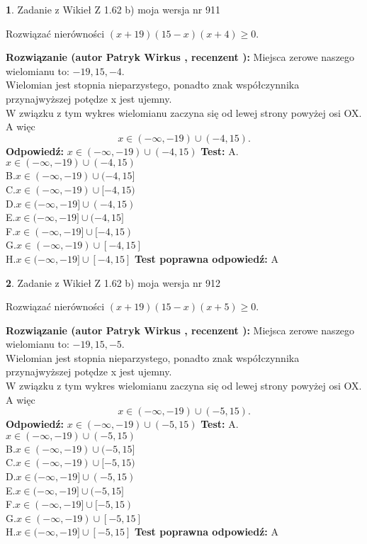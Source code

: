 \documentclass[12pt, a4paper]{article}
\theoremstyle{definition} %
\newtheorem{zad}{}
\newcommand{\zadStart}[1]{\begin{zad}#1\newline}
\newcommand{\zadStop}{\end{zad}}
\newcommand{\rozwStart}[2]{\noindent \textbf{Rozwiązanie (autor #1 , recenzent #2): }\newline}
\newcommand{\rozwStop}{\newline}
\newcommand{\odpStart}{\noindent \textbf{Odpowiedź:}\newline}
\newcommand{\odpStop}{\newline}
\newcommand{\testStart}{\noindent \textbf{Test:}\newline}
\newcommand{\testStop}{\newline}
\newcommand{\kluczStart}{\noindent \textbf{Test poprawna odpowiedź:}\newline}
\newcommand{\kluczStop}{\newline}
\begin{document}
\zadStart{Zadanie z Wikieł Z 1.62 b) moja wersja nr 911}

Rozwiązać nierówności $(x+19)(15-x)(x+4)\ge0$.
\zadStop
\rozwStart{Patryk Wirkus}{}
Miejsca zerowe naszego wielomianu to: $-19, 15, -4$.\\
Wielomian jest stopnia nieparzystego, ponadto znak współczynnika przy\linebreak najwyższej potędze x jest ujemny.\\ W związku z tym wykres wielomianu zaczyna się od lewej strony powyżej osi OX. A więc $$x \in (-\infty,-19) \cup (-4,15).$$
\rozwStop
\odpStart
$x \in (-\infty,-19) \cup (-4,15)$
\odpStop
\testStart
A.$x \in (-\infty,-19) \cup (-4,15)$\\
B.$x \in (-\infty,-19) \cup (-4,15]$\\
C.$x \in (-\infty,-19) \cup [-4,15)$\\
D.$x \in (-\infty,-19] \cup (-4,15)$\\
E.$x \in (-\infty,-19] \cup (-4,15]$\\
F.$x \in (-\infty,-19] \cup [-4,15)$\\
G.$x \in (-\infty,-19) \cup [-4,15]$\\
H.$x \in (-\infty,-19] \cup [-4,15]$
\testStop
\kluczStart
A
\kluczStop



\zadStart{Zadanie z Wikieł Z 1.62 b) moja wersja nr 912}

Rozwiązać nierówności $(x+19)(15-x)(x+5)\ge0$.
\zadStop
\rozwStart{Patryk Wirkus}{}
Miejsca zerowe naszego wielomianu to: $-19, 15, -5$.\\
Wielomian jest stopnia nieparzystego, ponadto znak współczynnika przy\linebreak najwyższej potędze x jest ujemny.\\ W związku z tym wykres wielomianu zaczyna się od lewej strony powyżej osi OX. A więc $$x \in (-\infty,-19) \cup (-5,15).$$
\rozwStop
\odpStart
$x \in (-\infty,-19) \cup (-5,15)$
\odpStop
\testStart
A.$x \in (-\infty,-19) \cup (-5,15)$\\
B.$x \in (-\infty,-19) \cup (-5,15]$\\
C.$x \in (-\infty,-19) \cup [-5,15)$\\
D.$x \in (-\infty,-19] \cup (-5,15)$\\
E.$x \in (-\infty,-19] \cup (-5,15]$\\
F.$x \in (-\infty,-19] \cup [-5,15)$\\
G.$x \in (-\infty,-19) \cup [-5,15]$\\
H.$x \in (-\infty,-19] \cup [-5,15]$
\testStop
\kluczStart
A
\kluczStop
\end{document}
